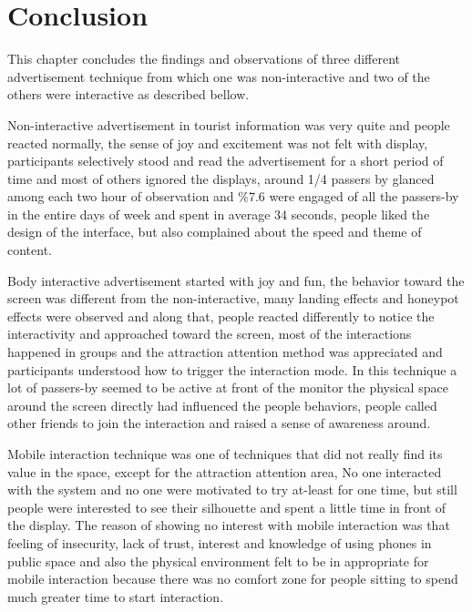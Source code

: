 \newpage
\section{Conclusion}

This chapter concludes the findings and observations of three different advertisement technique from which one was non-interactive and two of the others were interactive as described bellow.

Non-interactive advertisement in tourist information was very quite and people reacted normally, the sense of joy and excitement was not felt with display, participants selectively stood and read the advertisement for a short period of time and most of others ignored the displays, around 1/4 passers by glanced among each two hour of observation and \%7.6 were engaged of all the passers-by in the entire days of week and spent in average 34 seconds, people liked the design of the interface, but also complained about the speed and theme of content.

Body interactive advertisement started with joy and fun, the behavior toward the screen was different from the non-interactive, many landing effects and honeypot effects were observed and along that, people reacted differently to notice the interactivity and approached toward the screen, most of the interactions happened in groups and the attraction attention method was appreciated and participants understood how to trigger the interaction mode. In this technique a lot of passers-by seemed to be active at front of the monitor the physical space around the screen directly had influenced the people behaviors, people called other friends to join the interaction and raised a sense of awareness around. 

Mobile interaction technique was one of techniques that did not really find its value in the space, except for the attraction attention area, No one interacted with the system and no one were motivated to try at-least for one time, but still people were interested to see their silhouette and spent a little time in front of the display. The reason of showing no interest with mobile interaction was that feeling of insecurity, lack of trust, interest and knowledge of using phones in public space and also the physical environment felt to be in appropriate for mobile interaction because there was no comfort zone for people sitting to spend much greater time to start interaction.

